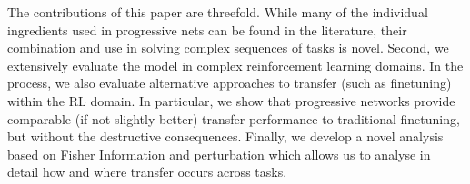 The contributions of this paper are threefold. While many of the individual
ingredients used in progressive nets can be found in the literature, their
combination and use in solving complex sequences of tasks is novel. Second,
we extensively evaluate the model in complex reinforcement learning domains.
In the process, we also evaluate alternative approaches to transfer
(such as finetuning) within the RL domain. In particular, we show that
progressive networks provide comparable (if not slightly better) transfer
performance to traditional finetuning, but without the destructive
consequences. Finally, we develop a novel analysis based on
Fisher Information and perturbation which allows us to analyse in
detail how and where transfer occurs across tasks.
